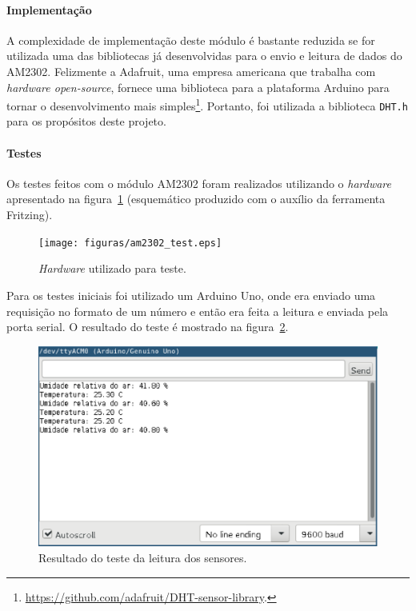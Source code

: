 	\paragraph{Implementação}

		A complexidade de implementação deste módulo é bastante reduzida
		se for utilizada uma das bibliotecas já desenvolvidas para o envio
		e leitura de dados do AM2302. Felizmente a Adafruit, uma empresa americana
		que trabalha com \textit{hardware open-source}, fornece uma biblioteca para
		a plataforma Arduino para tornar o desenvolvimento mais simples\footnote{\url{https://github.com/adafruit/DHT-sensor-library}.}.
		Portanto, foi utilizada a biblioteca \texttt{DHT.h} para os propósitos
		deste projeto.

	\paragraph{Testes}

		Os testes feitos com o módulo AM2302 foram realizados utilizando
		o \textit{hardware} apresentado na figura~\ref{fig:am2302test} (esquemático
		produzido com o auxílio da ferramenta Fritzing).

		\begin{figure}[!htbp]
		\begin{center}
		\texttt{[image: figuras/am2302\_test.eps]}
		\caption{\label{fig:am2302test}\textit{Hardware} utilizado para teste.}
		\end{center}
		\end{figure}

		Para os testes iniciais foi utilizado um Arduino Uno, onde era enviado uma requisição
		no formato de um número e então era feita a leitura e enviada pela porta serial.
		O resultado do teste é mostrado na figura~\ref{fig:am2302ardu}.

		\begin{figure}[!htbp]
		\begin{center}
		\includegraphics[width=.7\textwidth]{figuras/am2302_arduino.eps}
		\caption{\label{fig:am2302ardu}Resultado do teste da leitura dos sensores.}
		\end{center}
		\end{figure}

